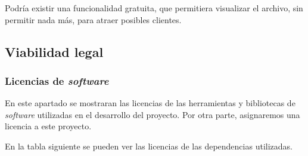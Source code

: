 Podría existir una funcionalidad gratuita, que permitiera visualizar el archivo, sin permitir nada más, para atraer posibles clientes.



\subsection{Viabilidad legal}
\subsubsection{Licencias de \emph{software}}

En este apartado se mostraran las licencias de las herramientas y bibliotecas de \emph{software} utilizadas en el desarrollo del proyecto. Por otra parte, asignaremos una licencia a este proyecto.

En la tabla siguiente se pueden ver las licencias de las dependencias utilizadas.

